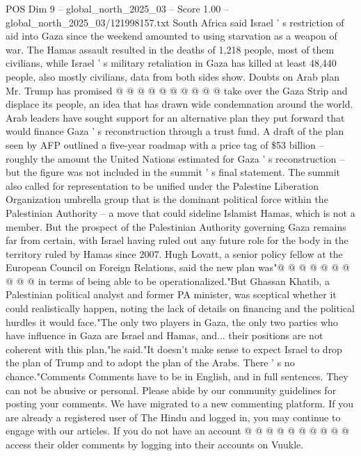 \begin{textsample}{POS Dim 9 – global\_north\_2025\_03 – Score 1.00 – global\_north\_2025\_03/121998157.txt}
South Africa said Israel ' s restriction of aid into Gaza since the weekend amounted to using starvation as a weapon of war.
The Hamas assault resulted in the deaths of 1,218 people, most of them civilians, while Israel ' s military retaliation in Gaza has killed at least 48,440 people, also mostly civilians, data from both sides show.
Doubts on Arab plan Mr.
Trump has promised @ @ @ @ @ @ @ @ @ @ take over the Gaza Strip and displace its people, an idea that has drawn wide condemnation around the world.
Arab leaders have sought support for an alternative plan they put forward that would finance Gaza ' s reconstruction through a trust fund.
A draft of the plan seen by AFP outlined a five-year roadmap with a price tag of \$53 billion -- roughly the amount the United Nations estimated for Gaza ' s reconstruction -- but the figure was not included in the summit ' s final statement.
The summit also called for representation to be unified under the Palestine Liberation Organization umbrella group that is the dominant political force within the Palestinian Authority -- a move that could sideline Islamist Hamas, which is not a member.
But the prospect of the Palestinian Authority governing Gaza remains far from certain, with Israel having ruled out any future role for the body in the territory ruled by Hamas since 2007.
Hugh Lovatt, a senior policy fellow at the European Council on Foreign Relations, said the new plan was"@ @ @ @ @ @ @ @ @ @ in terms of being able to be operationalized."But Ghassan Khatib, a Palestinian political analyst and former PA minister, was sceptical whether it could realistically happen, noting the lack of details on financing and the political hurdles it would face."The only two players in Gaza, the only two parties who have influence in Gaza are Israel and Hamas, and... their positions are not coherent with this plan,"he said."It doesn't make sense to expect Israel to drop the plan of Trump and to adopt the plan of the Arabs.
There ' s no chance."Comments Comments have to be in English, and in full sentences.
They can not be abusive or personal.
Please abide by our community guidelines for posting your comments.
We have migrated to a new commenting platform.
If you are already a registered user of The Hindu and logged in, you may continue to engage with our articles.
If you do not have an account @ @ @ @ @ @ @ @ @ @ access their older comments by logging into their accounts on Vuukle.

\end{textsample}
